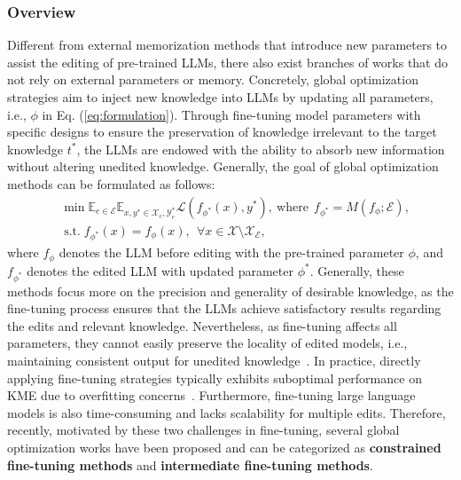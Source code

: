 \documentclass[acmsmall, screen]{acmart}
\def \st{\;\text{s.t.}\;}
\begin{document}
\subsubsection{{\textbf{Overview}}}
Different from external memorization methods that introduce new parameters to assist the editing of pre-trained LLMs, there also exist branches of works that do not rely on external parameters or memory. Concretely, global optimization strategies aim to inject new knowledge into LLMs by updating all parameters, i.e., $\phi$ in Eq. (\ref{eq:formulation}). Through fine-tuning model parameters with {specific designs to ensure the preservation of knowledge irrelevant to the target knowledge $t^*$}, the LLMs are endowed with the ability to absorb new information without altering unedited knowledge. Generally, the goal of global optimization methods can be formulated as follows:
    \begin{equation}
    \begin{aligned}
            & \min \mathbb{E}_{e \in \mathcal{E}} \mathbb{E}_{x, y^{*} \in \mathcal{X}_e, \mathcal{Y}^*_e} \mathcal{L} (f_{\phi^*}(x), y^{*}),\ \text{where}\ \  f_{\phi^*}=M(f_\phi; \mathcal{E}),\\
        &\st f_{\phi^*}(x)=f_{\phi}(x),\ \  \forall x\in \mathcal{X}\setminus \mathcal{X}_\mathcal{E},
    \end{aligned}
    \label{eq:finetune}
    \end{equation}
 where $f_\phi$ denotes the LLM before editing with the pre-trained parameter $\phi$, and $f_{\phi^*}$ denotes the edited LLM with updated parameter $\phi^*$.
Generally, these methods focus more on the precision and generality of desirable knowledge, as the fine-tuning process ensures that the LLMs achieve satisfactory results regarding the edits and relevant knowledge. Nevertheless, as fine-tuning affects all parameters, they cannot easily preserve the locality of edited models, i.e., maintaining consistent output for unedited knowledge~\cite{yao2023editing}. In practice, directly applying fine-tuning strategies typically exhibits suboptimal performance on KME due to overfitting concerns~\cite{wang2023easyedit,meng2023mass}. Furthermore, fine-tuning large language models is also time-consuming and lacks scalability for multiple edits. Therefore, recently, motivated by these two challenges in fine-tuning, several global optimization works have been proposed and can be categorized as \textbf{constrained fine-tuning methods} and \textbf{intermediate fine-tuning methods}.
\end{document}
